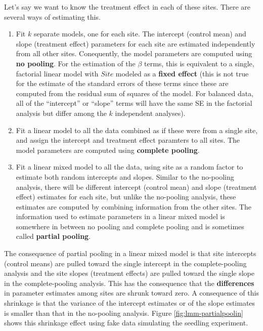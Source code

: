 \documentclass[]{book}
\begin{document}
Let's say we want to know the treatment effect in each of these sites.
There are several ways of estimating this.

\begin{enumerate}
\def\labelenumi{\arabic{enumi}.}
\item
  Fit \(k\) separate models, one for each site. The intercept (control
  mean) and slope (treatment effect) parameters for each site are
  estimated independently from all other sites. Conequently, the model
  parameters are computed using \textbf{no pooling}. For the estimation
  of the \(\beta\) terms, this is equivalent to a single, factorial
  linear model with \(Site\) modeled as a \textbf{fixed effect} (this is
  not true for the estimate of the standard errors of these terms since
  these are computed from the residual sum of squares of the model. For
  balanced data, all of the ``intercept'' or ``slope'' terms will have
  the same SE in the factorial analysis but differ among the \(k\)
  independent analyses).
\item
  Fit a linear model to all the data combined as if these were from a
  single site, and assign the intercept and treatment effect paramters
  to all sites. The model parameters are computed using \textbf{complete
  pooling}.
\item
  Fit a linear mixed model to all the data, using site as a random
  factor to estimate both random intercepts and slopes. Similar to the
  no-pooling analysis, there will be different intercept (control mean)
  and slope (treatment effect) estimates for each site, but unlike the
  no-pooling analysis, these estimates are computed by combining
  information from the other sites. The information used to estimate
  parameters in a linear mixed model is somewhere in between no pooling
  and complete pooling and is sometimes called \textbf{partial pooling}.
\end{enumerate}

The consequence of partial pooling in a linear mixed model is that site
intercepts (control means) are pulled toward the single intercept in the
complete-pooling analysis and the site slopes (treatment effects) are
pulled toward the single slope in the complete-pooling analysis. This
has the consequence that the \textbf{differences} in parameter estimates
among sites are shrunk toward zero. A consequence of this shrinkage is
that the variance of the intercept estimates or of the slope estimates
is smaller than that in the no-pooling analysis. Figure
\ref{fig:lmm-partialpoolin} shows this shrinkage effect using fake data
simulating the seedling experiment.
\end{document}
